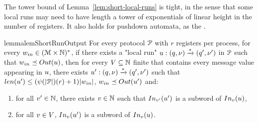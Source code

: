 \begin{remark}
	The tower bound of Lemma~\ref{lem:short-local-runs} is tight, in the sense that some local runs may need to have length a tower of exponentials of linear height in the number of registers.
	It also holds for pushdown automata, as the .
\end{remark}


\begin{restatable}{lemma}{lemShortRunOutput}
	\label{lem:short-run-for-output}
	For every protocol $\mathcal{P}$ with $r$ registers per process, for every $w_{in} \in (\mathcal{M}\times \mathbb{N})^*$, if there exists a "local run" $u: (q, \nu) \xrightarrow{*} (q', \nu')$ in $\mathcal{P}$ such that $w_{in} \subword \Output{\localrun}$, then for every $V \subseteq \mathbb{N}$ finite that contains every message value appearing in $u$, there exists $u': (q, \nu) \xrightarrow{*} (q', \nu')$ such that $\length{\localrun'} \leq (\towerfun(\size{\prot})(r)+1)\size{w_{in}}$, $w_{in} \subword \Output{\localrun'}$ and:
	
	\begin{enumerate}
		\item for all $v' \in \mathbb{N}$, there exists $v \in \mathbb{N}$ such that $\vinput{\aval'}{\localrun'}$ is a subword of $\vinput{\aval}{\localrun}$,
		\item for all $v \in V$, $\vinput{\aval}{\localrun'}$ is a subword of $\vinput{\aval}{\localrun}$. 
	\end{enumerate}
\end{restatable}


